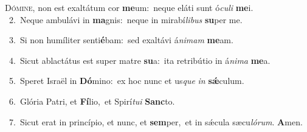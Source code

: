 \lettrine{\initial\textcolor{\initialcolor}{D}}{ómine,} non est exaltátum cor \textbf{me}\-um:~\star neque eláti sunt ó\-\textit{cu}\-\textit{li} \textbf{me}\-i.\\
{\numbfont\textcolor{\numbcolor}{~2.}}~Neque ambulávi in \textbf{ma}\-gnis:~\star neque in mirabí\-\textit{li}\-\textit{bus} \textbf{su}\-per me.\par
{\numbfont\textcolor{\numbcolor}{~3.}}~Si non humíliter senti\-\textbf{é}\-bam:~\star sed exaltávi á\-\textit{ni}\-\textit{mam} \textbf{me}\-am.\par
{\numbfont\textcolor{\numbcolor}{~4.}}~Sicut ablactátus est super matre \textbf{su}\-a:~\star ita retribútio in á\-\textit{ni}\-\textit{ma} \textbf{me}\-a.\par
{\numbfont\textcolor{\numbcolor}{~5.}}~Speret Israël in \textbf{Dó}\-mino:~\star ex hoc nunc et us\textit{que} \textit{in} \textbf{sǽ}\-culum.\par
{\numbfont\textcolor{\numbcolor}{~6.}}~Glória Patri, et \textbf{Fí}\-lio,~\star et Spirí\-\textit{tu}\-\textit{i} \textbf{Sanc}\-to.\par
{\numbfont\textcolor{\numbcolor}{~7.}}~Sicut erat in princípio, et nunc, et \textbf{sem}\-per,~\star et in sǽcula sæcu\-\textit{ló}\-\textit{rum}. \textbf{A}\-men.\par
